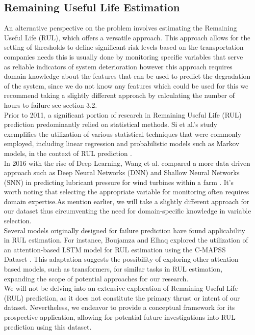 \documentclass{article}
\begin{document}
\subsection{Remaining Useful Life Estimation}

An alternative perspective on the problem involves estimating the Remaining Useful Life (RUL), which offers a versatile approach. This approach allows for the setting of thresholds to define significant risk levels based on the transportation companies needs this is usually done by monitoring specific variables that serve as reliable indicators of system deterioration however this approach requires domain knowledge about the features that can be used to predict the degradation of the system, since we do not know any features which could be used for this we recommend taking a slightly different approach by calculating the number of hours to failure see section 3.2. \\

Prior to 2011, a significant portion of research in Remaining Useful Life (RUL) prediction predominantly relied on statistical methods. Si et al.'s study exemplifies the utilization of various statistical techniques that were commonly employed, including linear regression and probabilistic models such as Markov models, in the context of RUL prediction \cite{SI2011}. \\

In 2016 with the rise of Deep Learning, Wang et al. compared a more data driven approach such as Deep Neural Networks (DNN) and Shallow Neural Networks (SNN) in predicting lubricant pressure for wind turbines within a farm \cite{wang2016}. It's worth noting that selecting the appropriate variable for monitoring often requires domain expertise.As mention earlier, we will take a slightly different approach for our dataset thus circumventing the need for domain-specific knowledge in variable selection. \\

Several models originally designed for failure prediction have found applicability in RUL estimation. For instance, Boujamza and Elhaq explored the utilization of an attention-based LSTM model for RUL estimation using the C-MAPSS Dataset \cite{Boujamza2022}. This adaptation suggests the possibility of exploring other attention-based models, such as transformers, for similar tasks in RUL estimation, expanding the scope of potential approaches for our research.\\

We will not be delving into an extensive exploration of Remaining Useful Life (RUL) prediction, as it does not constitute the primary thrust or intent of our dataset. Nevertheless, we endeavor to provide a conceptual framework for its prospective application, allowing for potential future investigations into RUL prediction using this dataset.
\end{document}
